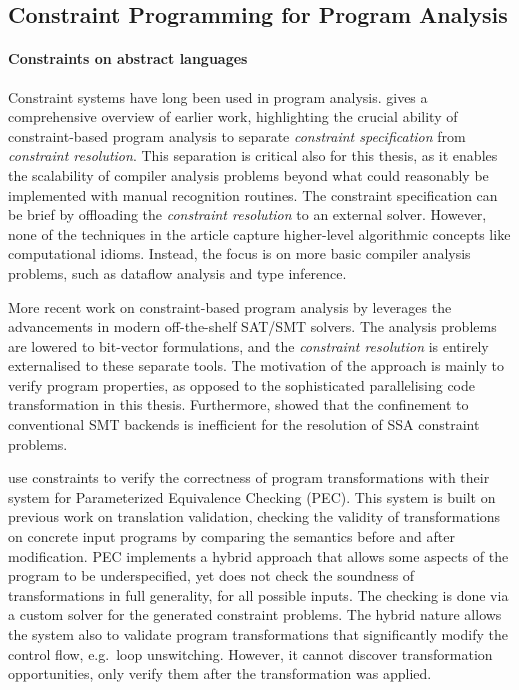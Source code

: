 \subsection{Constraint Programming for Program Analysis}

    \paragraph*{Constraints on abstract languages}
    Constraint systems have long been used in program analysis.
    \citet{Aiken:1999:ISC:339853.339897} gives a comprehensive overview of
    earlier work, highlighting the crucial ability of constraint-based program
    analysis to separate {\it constraint specification} from
    {\it constraint resolution}.
    This separation is critical also for this thesis, as it enables the
    scalability of compiler analysis problems beyond what could reasonably be
    implemented with manual recognition routines.
    The constraint specification can be brief by offloading the
    {\it constraint resolution} to an external solver.
    However, none of the techniques in the article capture higher-level
    algorithmic concepts like computational idioms.
    Instead, the focus is on more basic compiler analysis problems, such as
    dataflow analysis and type inference.

    More recent work on constraint-based program analysis by
    \citet{Gulwani:2008:PAC:1375581.1375616} leverages the advancements in
    modern off-the-shelf SAT/SMT solvers.
    The analysis problems are lowered to bit-vector formulations, and the
    {\it constraint resolution} is entirely externalised to these separate
    tools.
    The motivation of the approach is mainly to verify program properties,
    as opposed to the  sophisticated parallelising code transformation in
    this thesis.
    Furthermore,  showed that the confinement to
    conventional SMT backends is inefficient for the resolution of
    SSA constraint problems.

    \citet{Kundu:2009:POC:1543135.1542513} use constraints to verify the
    correctness of program transformations with their system for
    Parameterized Equivalence Checking (PEC).
    This system is built on previous work on translation validation, checking
    the validity of transformations on concrete input programs by comparing the
    semantics before and after modification.
    PEC implements a hybrid approach that allows some aspects of the program
    to be underspecified, yet does not check the soundness of transformations
    in full generality, for all possible inputs.
    The checking is done via a custom solver for the generated constraint
    problems.
    The hybrid nature allows the system also to validate program transformations
    that significantly modify the control flow, e.g.\ loop unswitching.
    However, it cannot discover transformation opportunities, only verify them
    after the transformation was applied.

